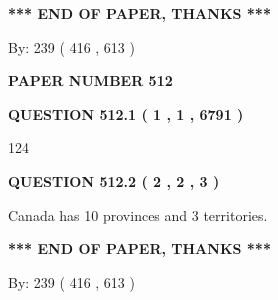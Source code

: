 \documentclass[12pt]{article}
\begin{document}
   
   
\vspace{1.0in} 
{\textbf{\large{ *** END OF PAPER, THANKS *** }}} 
   
   
\hspace{1.0in} By: 
 239 ( 416 ,  613 )
   
   
   
   
\newpage 
\setcounter{page}{ 
   512001 } 
   
   
   
   
 {\textbf{ \Large{ PAPER NUMBER  512  }}}
   
   
\vspace{0.2in}
   
   
   
   
   
   
 \vspace{0.2in}
 
 
 
 
   
   
  
\vspace{0.2in}
  
{\textbf{\Large{QUESTION
512.1 
 ( 1 , 1 , 6791 )
}}}
  
  
 
 
\noindent{}

124
 
 
  
\vspace{0.2in}
  
{\textbf{\Large{QUESTION
512.2 
 ( 2 , 2 , 3 )
}}}
  
  
 
 
\noindent{}
 
 
Canada has 10  provinces and 3 territories.
 
 
 
 
   
   
 \vspace{0.2in}
 
   
   
   
   
\vspace{1.0in} 
{\textbf{\large{ *** END OF PAPER, THANKS *** }}} 
   
   
\hspace{1.0in} By: 
 239 ( 416 ,  613 )
   
\end{document}
